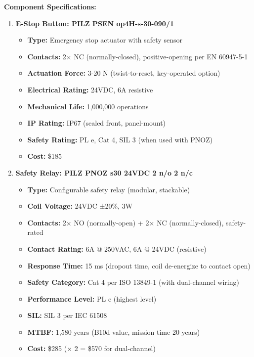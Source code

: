 \documentclass[
]{article}
\providecommand{\tightlist}{%
  \setlength{\itemsep}{0pt}\setlength{\parskip}{0pt}}
\begin{document}
\textbf{Component Specifications:}

\begin{enumerate}
\def\labelenumi{\arabic{enumi}.}
\tightlist
\item
  \textbf{E-Stop Button: PILZ PSEN op4H-s-30-090/1}

  \begin{itemize}
  \tightlist
  \item
    \textbf{Type:} Emergency stop actuator with safety sensor
  \item
    \textbf{Contacts:} 2× NC (normally-closed), positive-opening per EN
    60947-5-1
  \item
    \textbf{Actuation Force:} 3-20 N (twist-to-reset, key-operated
    option)
  \item
    \textbf{Electrical Rating:} 24VDC, 6A resistive
  \item
    \textbf{Mechanical Life:} 1,000,000 operations
  \item
    \textbf{IP Rating:} IP67 (sealed front, panel-mount)
  \item
    \textbf{Safety Rating:} PL e, Cat 4, SIL 3 (when used with PNOZ)
  \item
    \textbf{Cost:} \$185
  \end{itemize}
\item
  \textbf{Safety Relay: PILZ PNOZ s30 24VDC 2 n/o 2 n/c}

  \begin{itemize}
  \tightlist
  \item
    \textbf{Type:} Configurable safety relay (modular, stackable)
  \item
    \textbf{Coil Voltage:} 24VDC ±20\%, 3W
  \item
    \textbf{Contacts:} 2× NO (normally-open) + 2× NC (normally-closed),
    safety-rated
  \item
    \textbf{Contact Rating:} 6A @ 250VAC, 6A @ 24VDC (resistive)
  \item
    \textbf{Response Time:} 15 ms (dropout time, coil de-energize to
    contact open)
  \item
    \textbf{Safety Category:} Cat 4 per ISO 13849-1 (with dual-channel
    wiring)
  \item
    \textbf{Performance Level:} PL e (highest level)
  \item
    \textbf{SIL:} SIL 3 per IEC 61508
  \item
    \textbf{MTBF:} 1,580 years (B10d value, mission time 20 years)
  \item
    \textbf{Cost:} \$285 (× 2 = \$570 for dual-channel)
  \end{itemize}
\end{enumerate}
\end{document}
